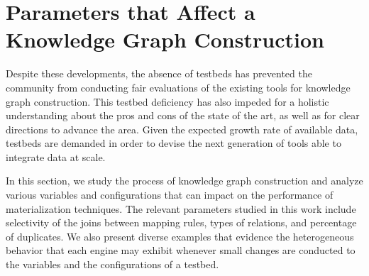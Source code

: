 \section{Parameters that Affect a Knowledge Graph Construction}
\label{chapter5:sec-param}
Despite these developments, the absence of testbeds has prevented the community from conducting fair evaluations of the existing tools for knowledge graph construction. This testbed deficiency has also impeded for a holistic understanding about the pros and cons of the state of the art, as well as for clear directions to advance the area. Given the expected growth rate of available data, testbeds are demanded in order to devise the next generation of tools able to integrate data at scale.

In this section, we study the process of knowledge graph construction and analyze various variables and configurations that can impact on the performance of materialization techniques. The relevant parameters studied in this work include selectivity of the joins between mapping rules, types of relations, and percentage of duplicates. We also present diverse examples that evidence the heterogeneous behavior that each engine may exhibit whenever small changes are conducted to the variables and the configurations of a testbed.  

